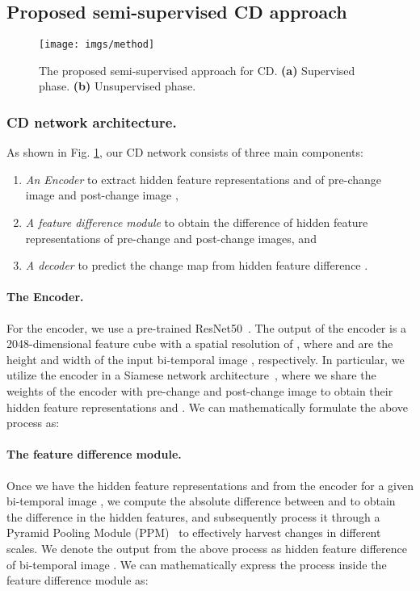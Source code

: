 \documentclass[runningheads]{llncs}
\begin{document}
\subsection{Proposed semi-supervised CD approach}
\begin{figure}[!tb]
    \centering
    \label{fig:network}
    \texttt{[image: imgs/method]}
    \caption{The proposed semi-supervised approach for CD. \textbf{(a)} Supervised phase. \textbf{(b)} Unsupervised phase. \vspace{-5mm}}
\end{figure}

\subsubsection{CD network architecture.} As shown in Fig. \ref{fig:network}, our CD network consists of three main components:
\begin{enumerate}
     \item \textit{An Encoder } to extract hidden feature representations  and  of pre-change image  and post-change image ,
     \item \textit{A feature difference module} to obtain the difference of hidden feature representations  of pre-change and post-change images, and
     \item \textit{A decoder } to predict the change map from hidden feature difference .
 \end{enumerate}
\paragraph{The Encoder.} For the encoder, we use a  pre-trained ResNet50~\cite{he2016deep}. The output of the encoder is a 2048-dimensional feature cube with a spatial resolution of , where  and  are the height and width of the input bi-temporal image , respectively. In particular, we utilize the encoder in a Siamese network architecture~\cite{bromley1993signature}, where we share the weights of the encoder with pre-change  and post-change  image to obtain their hidden feature representations  and . We can mathematically formulate the above process as:
\setlength{\belowdisplayskip}{0pt} \setlength{\belowdisplayshortskip}{0pt}
\setlength{\abovedisplayskip}{0pt} \setlength{\abovedisplayshortskip}{0pt}

\paragraph{The feature difference module.} Once we have the hidden feature representations  and  from the encoder for a given bi-temporal image , we compute the absolute difference between  and  to obtain the difference in the hidden features, and subsequently process it through a Pyramid Pooling Module (PPM)~\cite{zhao2017pyramid}  to effectively harvest changes in different scales. We denote the output from the above process as hidden feature difference  of bi-temporal image . We can mathematically express the process inside the feature difference module  as:
\end{document}
